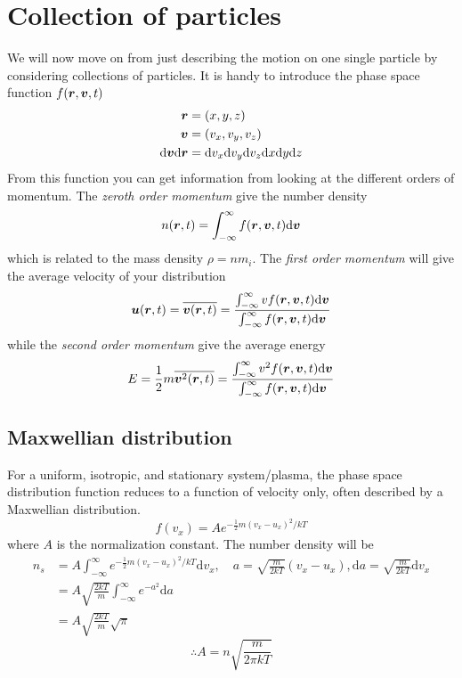 \section{Collection of particles}
We will now move on from just describing the motion on one single particle by considering collections of particles. It is handy to introduce the phase space function \(f(\boldsymbol{r},\boldsymbol{v},t)\)
\begin{align*}
    \boldsymbol{r}&=(x,y,z)\\
    \boldsymbol{v}&=(v_x,v_y,v_z)\\
    \text{d}\boldsymbol{v}\text{d}\boldsymbol{r}&=\text{d}v_x\text{d}v_y\text{d}v_z\text{d}x\text{d}y\text{d}z
\end{align*}
From this function you can get information from looking at the different orders of momentum. The \emph{zeroth order momentum} give the number density
\begin{equation*}
    n(\boldsymbol{r},t)=\int_{-\infty}^\infty f(\boldsymbol{r},\boldsymbol{v},t)\text{d}\boldsymbol{v}
\end{equation*}
which is related to the mass density \(\rho=nm_i\). The \emph{first order momentum} will give the average velocity of your distribution
\begin{equation*}
    \boldsymbol{u}(\boldsymbol{r},t)=\overline{\boldsymbol{v}(\boldsymbol{r},t)}=\frac{\int_{-\infty}^\infty vf(\boldsymbol{r},\boldsymbol{v},t)\text{d}\boldsymbol{v}}{\int_{-\infty}^\infty f(\boldsymbol{r},\boldsymbol{v},t)\text{d}\boldsymbol{v}}
\end{equation*}
while the \emph{second order momentum} give the average energy
\begin{equation*}
    E=\frac{1}{2}m\overline{\boldsymbol{v}^2(\boldsymbol{r},t)}=\frac{\int_{-\infty}^\infty v^2f(\boldsymbol{r},\boldsymbol{v},t)\text{d}\boldsymbol{v}}{\int_{-\infty}^\infty f(\boldsymbol{r},\boldsymbol{v},t)\text{d}\boldsymbol{v}}
\end{equation*}

\subsection{Maxwellian distribution}
For a uniform, isotropic, and stationary system/plasma, the phase space distribution function reduces to a function of velocity only, often described by a Maxwellian distribution.
\begin{equation*}
    f(v_x)=Ae^{-\frac{1}{2}m{(v_x-u_x)}^2/kT}
\end{equation*}
where \(A\) is the normalization constant. The number density will be
\begin{align*}
    n_s&=A\int_{-\infty}^\infty e^{-\frac{1}{2}m{(v_x-u_x)}^2/kT}\text{d}v_x,\quad a=\sqrt{\frac{m}{2kT}}(v_x-u_x),\text{d}a=\sqrt{\frac{m}{2kT}}\text{d}v_x\\
    &=A\sqrt{\frac{2kT}{m}}\int_{-\infty}^\infty e^{-a^2}\text{d}a\\
    &=A\sqrt{\frac{2kT}{m}}\sqrt{\pi}
\end{align*}
\begin{equation*}
    \therefore A=n\sqrt{\frac{m}{2\pi kT}}
\end{equation*}

